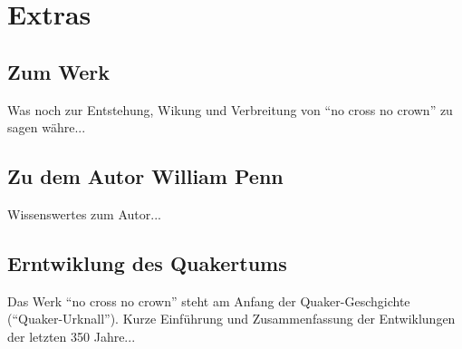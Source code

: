 
\part{Extras}


\chapter{Zum Werk}
Was noch zur Entstehung, Wikung und Verbreitung von "`no cross no crown"' zu sagen währe...

\chapter{Zu dem Autor William Penn}
Wissenswertes zum Autor...

\chapter{Erntwiklung des Quakertums}
Das Werk "`no cross no crown"' steht am Anfang der Quaker-Geschgichte ("`Quaker-Urknall"'). Kurze Einführung und Zusammenfassung der Entwiklungen der letzten 350 Jahre...